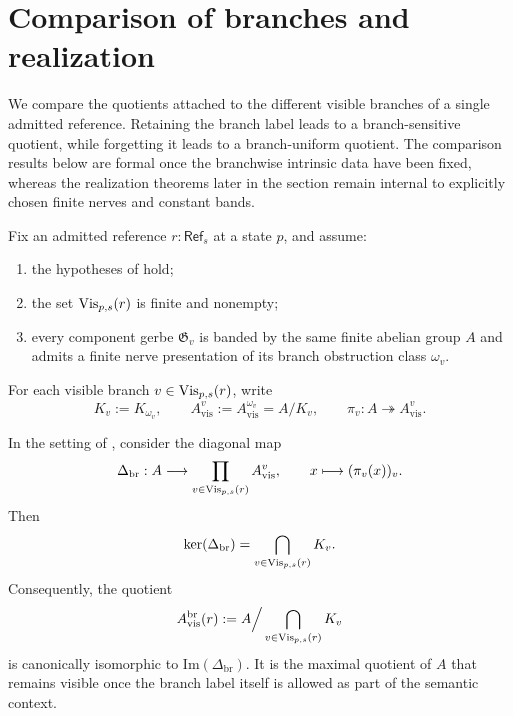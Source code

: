 \section{Comparison of branches and realization}\label{sec:branch-aggregation}

We compare the quotients attached to the different visible branches of a single admitted reference. Retaining the branch label leads to a branch-sensitive quotient, while forgetting it leads to a branch-uniform quotient. The comparison results below are formal once the branchwise intrinsic data have been fixed, whereas the realization theorems later in the section remain internal to explicitly chosen finite nerves and constant bands.

\begin{definition}\label{def:branchwise-intrinsic-data}
Fix an admitted reference $r:\mathsf{Ref}_s$ at a state $p$, and assume:
\begin{enumerate}[label=(\roman*),nosep]
\item the hypotheses of  hold;
\item the set $\mathrm{Vis}_{p,s}(r)$ is finite and nonempty;
\item every component gerbe $\mathfrak G_v$ is banded by the same finite abelian group $A$ and admits a finite nerve presentation of its branch obstruction class $\omega_v$.
\end{enumerate}
For each visible branch $v\in \mathrm{Vis}_{p,s}(r)$, write
\[
K_v:=K_{\omega_v},
\qquad
A_{\mathrm{vis}}^v:=A_{\mathrm{vis}}^{\omega_v}=A/K_v,
\qquad
\pi_v:A\twoheadrightarrow A_{\mathrm{vis}}^v.
\]
\end{definition}

\begin{proposition}\label{thm:branch-sensitive-visible-quotient}
In the setting of , consider the diagonal map
\[
\Delta_{\mathrm{br}}:A\longrightarrow \prod_{v\in \mathrm{Vis}_{p,s}(r)} A_{\mathrm{vis}}^v,
\qquad
x\longmapsto (\pi_v(x))_v.
\]
Then
\[
\ker(\Delta_{\mathrm{br}})=\bigcap_{v\in \mathrm{Vis}_{p,s}(r)} K_v.
\]
Consequently, the quotient
\[
A_{\mathrm{vis}}^{\mathrm{br}}(r):=A\Big/\bigcap_{v\in \mathrm{Vis}_{p,s}(r)} K_v
\]
is canonically isomorphic to $\mathrm{Im}(\Delta_{\mathrm{br}})$. It is the maximal quotient of $A$ that remains visible once the branch label itself is allowed as part of the semantic context.
\end{proposition}


